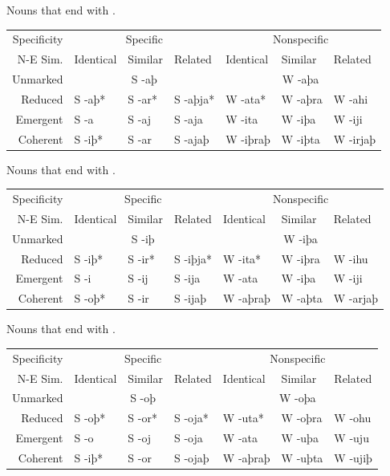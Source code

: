 \documentclass{book}
\begin{document}
\begin{tablenf}
  \caption{Nouns that end with .}
  \centering
  \begin{tabular}{r|lll|lll}
    Specificity & \multicolumn{3}{c|}{Specific} & \multicolumn{3}{c}{Nonspecific} \\
    N-E \bs{} Sim. & Identical & Similar & Related & Identical & Similar & Related \\
    \hline
    Unmarked & \multicolumn{3}{c|}{S -aþ} & \multicolumn{3}{c}{W -aþa} \\
    Reduced & S -aþ* & S -ar* & S -aþja* & W -ata* & W -aþra & W -ahi \\
    Emergent & S -a & S -aj & S -aja & W -ita & W -iþa & W -iji \\
    Coherent & S -iþ* & S -ar & S -ajaþ & W -iþraþ & W -iþta & W -irjaþ \\
  \end{tabular}
\end{tablenf}

\begin{tablenf}
  \caption{Nouns that end with .}
  \centering
  \begin{tabular}{r|lll|lll}
    Specificity & \multicolumn{3}{c|}{Specific} & \multicolumn{3}{c}{Nonspecific} \\
    N-E \bs{} Sim. & Identical & Similar & Related & Identical & Similar & Related \\
    \hline
    Unmarked & \multicolumn{3}{c|}{S -iþ} & \multicolumn{3}{c}{W -iþa} \\
    Reduced & S -iþ* & S -ir* & S -iþja* & W -ita* & W -iþra & W -ihu \\
    Emergent & S -i & S -ij & S -ija & W -ata & W -iþa & W -iji \\
    Coherent & S -oþ* & S -ir & S -ijaþ & W -aþraþ & W -aþta & W -arjaþ \\
  \end{tabular}
\end{tablenf}

\begin{tablenf}
  \caption{Nouns that end with .}
  \centering
  \begin{tabular}{r|lll|lll}
    Specificity & \multicolumn{3}{c|}{Specific} & \multicolumn{3}{c}{Nonspecific} \\
    N-E \bs{} Sim. & Identical & Similar & Related & Identical & Similar & Related \\
    \hline
    Unmarked & \multicolumn{3}{c|}{S -oþ} & \multicolumn{3}{c}{W -oþa} \\
    Reduced & S -oþ* & S -or* & S -oja* & W -uta* & W -oþra & W -ohu \\
    Emergent & S -o & S -oj & S -oja & W -ata & W -uþa & W -uju \\
    Coherent & S -iþ* & S -or & S -ojaþ & W -aþraþ & W -uþta & W -ujiþ \\
  \end{tabular}
\end{tablenf}
\end{document}
